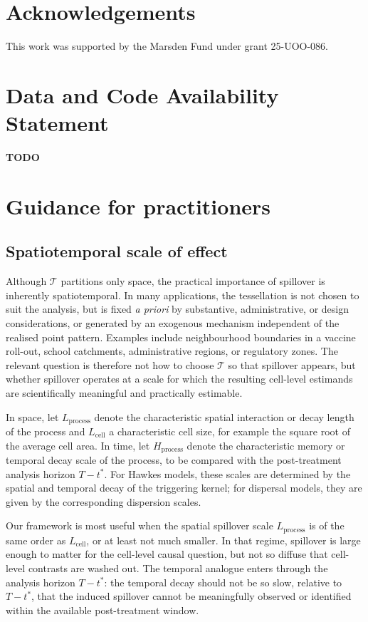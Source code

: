 \documentclass{statsoc}
\newcommand{\1}{\mathbbm{1}}
\newif\ifinappendix
\let\oldappendix\appendix
\renewcommand{\appendix}{%
  \oldappendix
  \inappendixtrue
}
\begin{document}
\section*{Acknowledgements}
This work was supported by the Marsden Fund under grant 25-UOO-086. 

\section{Data and Code Availability Statement}
\textbf{TODO}

      
 
\newpage

\appendix
\section{Guidance for practitioners}

\subsection{Spatiotemporal scale of effect}\label{sec:scale-of-effect}
Although \(\mathcal T\) partitions only space, the practical importance of spillover is inherently spatiotemporal. In many applications, the tessellation is not chosen to suit the analysis, but is fixed \textit{a priori} by substantive, administrative, or design considerations, or generated by an exogenous mechanism independent of the realised point pattern. Examples include neighbourhood boundaries in a vaccine roll-out, school catchments, administrative regions, or regulatory zones. The relevant question is therefore not how to choose \(\mathcal T\) so that spillover appears, but whether spillover operates at a scale for which the resulting cell-level estimands are scientifically meaningful and practically estimable.

In space, let \(L_{\text{process}}\) denote the characteristic spatial interaction or decay length of the process and \(L_{\text{cell}}\) a characteristic cell size, for example the square root of the average cell area. In time, let \(H_{\text{process}}\) denote the characteristic memory or temporal decay scale of the process, to be compared with the post-treatment analysis horizon \(T-t^\ast\). For Hawkes models, these scales are determined by the spatial and temporal decay of the triggering kernel; for dispersal models, they are given by the corresponding dispersion scales.

Our framework is most useful when the spatial spillover scale \(L_{\text{process}}\) is of the same order as \(L_{\text{cell}}\), or at least not much smaller. In that regime, spillover is large enough to matter for the cell-level causal question, but not so diffuse that cell-level contrasts are washed out. The temporal analogue enters through the analysis horizon \(T-t^\ast\): the temporal decay should not be so slow, relative to \(T-t^\ast\), that the induced spillover cannot be meaningfully observed or identified within the available post-treatment window.
\end{document}
